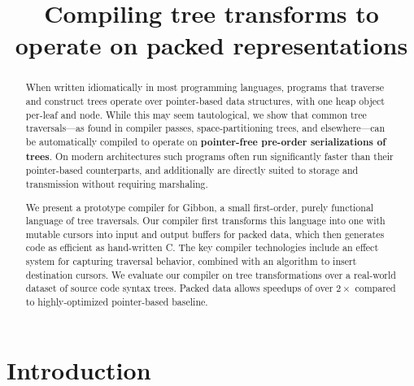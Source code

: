 \documentclass[a4paper,english]{lipics-v2016}
\title{Compiling tree transforms to operate on packed representations}
\author[1]{}
\begin{document}
\maketitle

\begin{abstract}
When written idiomatically in most programming languages, programs that traverse
and construct trees operate over pointer-based data structures, with one heap
object per-leaf and node.  While this may seem tautological, we show that common
tree traversals---as found in compiler passes, space-partitioning trees, and
elsewhere---can  be automatically compiled to operate on \textbf{pointer-free
pre-order serializations of trees}.  On modern architectures such programs
often run {significantly} faster than their pointer-based counterparts,
{and additionally are directly suited to storage and transmission without
  requiring marshaling.}

We present a prototype compiler for \textsf{Gibbon}, a small
first-order, purely functional language of tree traversals.  Our
compiler first transforms this language into one with
mutable cursors into input and output buffers
for packed data, which then generates code as efficient as
hand-written C. The key compiler technologies include an effect
system for capturing traversal behavior, combined with an
algorithm to insert destination cursors.
We evaluate our compiler on 
tree transformations over a real-world dataset of source code syntax trees.
{Packed data allows speedups of over $2\times$ compared to highly-optimized
  pointer-based baseline.}

\end{abstract}




\section{Introduction}\label{sec:intro}

\end{document}
